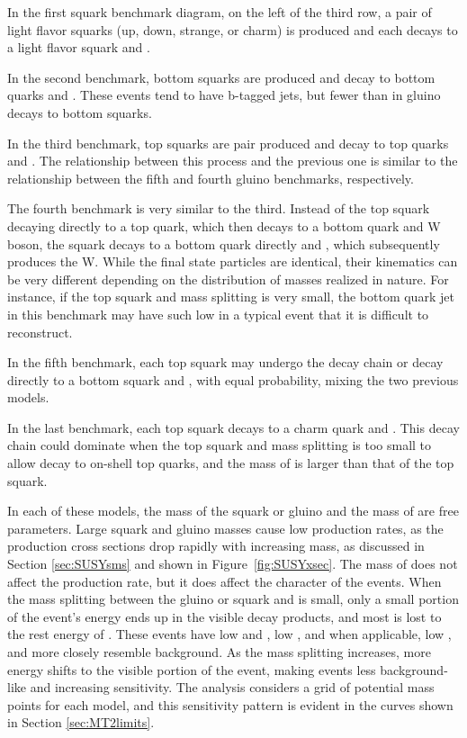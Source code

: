     In the first squark benchmark diagram, on the left of the third row, a pair of light flavor squarks (up, down, strange, or charm) is produced and each decays to a light flavor squark and \lsp.
   
    In the second benchmark, bottom squarks are produced and decay to bottom quarks and \lsp.
    These events tend to have b-tagged jets, but fewer than in gluino decays to bottom squarks.

    In the third benchmark, top squarks are pair produced and decay to top quarks and \lsp.
    The relationship between this process and the previous one is similar to the relationship between the fifth and fourth gluino benchmarks, respectively.

    The fourth benchmark is very similar to the third.
    Instead of the top squark decaying directly to a top quark, which then decays to a bottom quark and W boson, the squark decays to a bottom quark directly and \chargino, which subsequently produces the W.
    While the final state particles are identical, their kinematics can be very different depending on the distribution of masses realized in nature.
    For instance, if the top squark and \chargino mass splitting is very small, the bottom quark jet in this benchmark may have such low \pt in a typical event that it is difficult to reconstruct.

    In the fifth benchmark, each top squark may undergo the \chargino decay chain or decay directly to a bottom squark and \lsp, with equal probability, mixing the two previous models.

    In the last benchmark, each top squark decays to a charm quark and \lsp.
    This decay chain could dominate when the top squark and \lsp mass splitting is too small to allow decay to on-shell top quarks, and the mass of \chargino is larger than that of the top squark.

    In each of these models, the mass of the squark or gluino and the mass of \lsp are free parameters.
    Large squark and gluino masses cause low production rates, as the production cross sections drop rapidly with increasing mass, as discussed in Section \ref{sec:SUSYsms} and shown in Figure~\ref{fig:SUSYxsec}.
    The mass of \lsp does not affect the production rate, but it does affect the character of the events.
    When the mass splitting between the gluino or squark and \lsp is small, only a small portion of the event's energy ends up in the visible decay products, and most is lost to the rest energy of \lsp.
    These events have low \Ht and \met, low \njet, and when applicable, low \nb, and more closely resemble background.
    As the mass splitting increases, more energy shifts to the visible portion of the event, making events less background-like and increasing sensitivity.
    The analysis considers a grid of potential mass points for each model, and this sensitivity pattern is evident in the curves shown in Section \ref{sec:MT2limits}.
    
